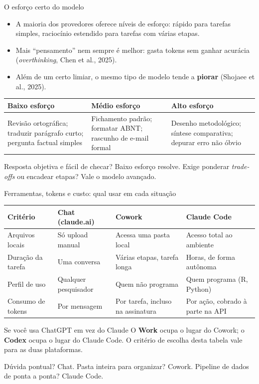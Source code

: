 \documentclass[11pt,aspectratio=169,t]{beamer}
\begin{document}
\begin{frame}{O esforço certo do modelo}
  \small
  \begin{itemize}
    \item A maioria dos provedores oferece níveis de esforço: rápido para tarefas simples, raciocínio estendido para tarefas com várias etapas.
    \item Mais ``pensamento'' nem sempre é melhor: gasta tokens sem ganhar acurácia (\textit{overthinking}, Chen et al., 2025).
    \item Além de um certo limiar, o mesmo tipo de modelo tende a \textbf{piorar} (Shojaee et al., 2025).
  \end{itemize}
  \pause
  \vfill
  \scriptsize
  \renewcommand{\arraystretch}{1.2}
  \begin{tabular}{p{4.0cm} p{4.0cm} p{4.0cm}}
    \toprule
    \textbf{Baixo esforço} & \textbf{Médio esforço} & \textbf{Alto esforço} \\
    \midrule
    Revisão ortográfica; traduzir parágrafo curto; pergunta factual simples
    & Fichamento padrão; formatar ABNT; rascunho de e-mail formal
    & Desenho metodológico; síntese comparativa; depurar erro não óbvio \\
    \bottomrule
  \end{tabular}
  \pause
  \vfill
  \centering\small Resposta objetiva e fácil de checar? Baixo esforço resolve.
  Exige ponderar \textit{trade-offs} ou encadear etapas? Vale o modelo avançado.
\end{frame}

\begin{frame}{Ferramentas, tokens e custo: qual usar em cada situação}
  \scriptsize
  \renewcommand{\arraystretch}{1.15}
  \begin{tabular}{p{2.6cm} p{3.5cm} p{3.6cm} p{3.7cm}}
    \toprule
    \textbf{Critério} & \textbf{Chat (claude.ai)} & \textbf{Cowork} & \textbf{Claude Code} \\
    \midrule
    Arquivos locais & Só upload manual & Acessa uma pasta local & Acesso total ao ambiente \\
    Duração da tarefa & Uma conversa & Várias etapas, tarefa longa & Horas, de forma autônoma \\
    Perfil de uso & Qualquer pesquisador & Quem não programa & Quem programa (R, Python) \\
    Consumo de tokens & Por mensagem & Por tarefa, incluso na assinatura & Por ação, cobrado à parte na API \\
    \bottomrule
  \end{tabular}
  \pause
  \vfill
  \begin{exampleblock}{Se você usa ChatGPT em vez do Claude}
    \small O \textbf{Work} ocupa o lugar do Cowork; o \textbf{Codex} ocupa o
    lugar do Claude Code. O critério de escolha desta tabela vale para as
    duas plataformas.
  \end{exampleblock}
  \pause
  \centering\small Dúvida pontual? Chat. Pasta inteira para organizar?
  Cowork. Pipeline de dados de ponta a ponta? Claude Code.
\end{frame}
\end{document}
